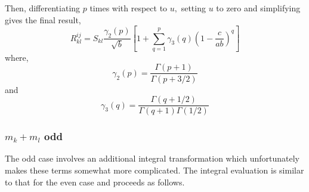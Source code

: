\documentclass[12pt]{article}
\begin{document}
Then, differentiating $p$ times with respect to $u,$ setting $u$ to zero and
simplifying gives the final result,
\begin{equation}
R_{kl}^{ij}=S_{kl}\frac{\gamma_{2}\left(  p\right)  }{\sqrt{b}}\left[
1+\sum_{q=1}^{p}\gamma_{3}\left(  q\right)  \left(  1-\frac{c}{ab}\right)
^{q}\right] \label{Rkleven}%
\end{equation}
where,
\begin{equation}
\gamma_{2}\left(  p\right)  =\frac{\Gamma\left(  p+1\right)  }{\Gamma\left(
p+3/2\right)  }\label{gamma2}%
\end{equation}
and
\begin{equation}
\gamma_{3}\left(  q\right)  =\frac{\Gamma\left(  q+1/2\right)  }{\Gamma\left(
q+1\right)  \Gamma\left(  1/2\right)  }\label{gamma3}%
\end{equation}

\subsubsection{$m_{k}+m_{l}$ odd}

The odd case involves an additional integral transformation which
unfortunately makes these terms somewhat more complicated. The integral
evaluation is similar to that for the even case and proceeds as follows.
\end{document}
